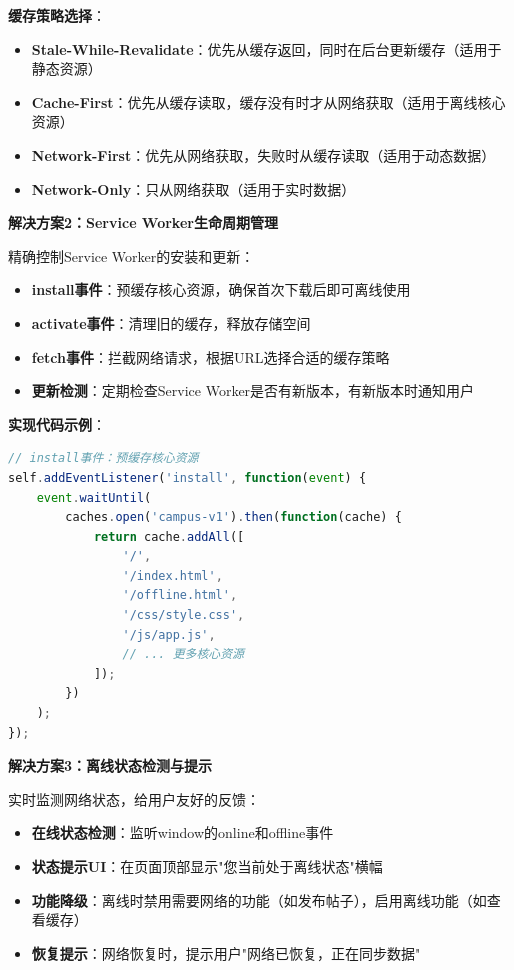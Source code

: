 \documentclass[12pt,a4paper]{article}
\begin{document}
\textbf{缓存策略选择}：
\begin{itemize}
    \item \textbf{Stale-While-Revalidate}：优先从缓存返回，同时在后台更新缓存（适用于静态资源）
    \item \textbf{Cache-First}：优先从缓存读取，缓存没有时才从网络获取（适用于离线核心资源）
    \item \textbf{Network-First}：优先从网络获取，失败时从缓存读取（适用于动态数据）
    \item \textbf{Network-Only}：只从网络获取（适用于实时数据）
\end{itemize}

\textbf{解决方案2：Service Worker生命周期管理}

精确控制Service Worker的安装和更新：

\begin{itemize}
    \item \textbf{install事件}：预缓存核心资源，确保首次下载后即可离线使用
    \item \textbf{activate事件}：清理旧的缓存，释放存储空间
    \item \textbf{fetch事件}：拦截网络请求，根据URL选择合适的缓存策略
    \item \textbf{更新检测}：定期检查Service Worker是否有新版本，有新版本时通知用户
\end{itemize}

\textbf{实现代码示例}：

\begin{lstlisting}[language=JavaScript]
// install事件：预缓存核心资源
self.addEventListener('install', function(event) {
    event.waitUntil(
        caches.open('campus-v1').then(function(cache) {
            return cache.addAll([
                '/',
                '/index.html',
                '/offline.html',
                '/css/style.css',
                '/js/app.js',
                // ... 更多核心资源
            ]);
        })
    );
});
\end{lstlisting}

\textbf{解决方案3：离线状态检测与提示}

实时监测网络状态，给用户友好的反馈：

\begin{itemize}
    \item \textbf{在线状态检测}：监听window的online和offline事件
    \item \textbf{状态提示UI}：在页面顶部显示"您当前处于离线状态"横幅
    \item \textbf{功能降级}：离线时禁用需要网络的功能（如发布帖子），启用离线功能（如查看缓存）
    \item \textbf{恢复提示}：网络恢复时，提示用户"网络已恢复，正在同步数据"
\end{itemize}
\end{document}
